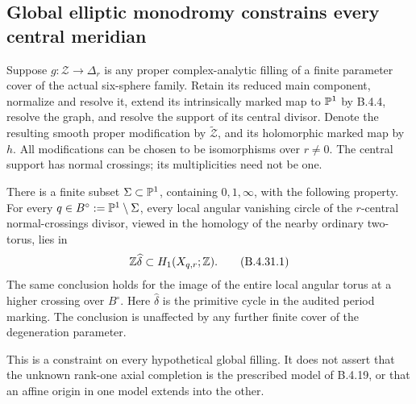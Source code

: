 \subsection{Global elliptic monodromy constrains every central meridian}

\begin{proposition}
Suppose $g:\mathcal Z\to\Delta_r$ is any proper complex-analytic
filling of a finite parameter cover of the actual six-sphere
family. Retain its reduced main component, normalize and resolve
it, extend its intrinsically marked map to $\mathbb P^1$ by B.4.4,
resolve the graph, and resolve the support of its central divisor. Denote
the resulting smooth proper modification by $\widetilde{\mathcal Z}$,
and its holomorphic marked map by $h$. All modifications can be
chosen to be isomorphisms over $r\ne0$. The central support has
normal crossings; its multiplicities need not be one.

There is a finite subset $\Sigma\subset\mathbb P^1$, containing
$0,1,\infty$, with the following property. For every
$q\in B^\circ:=\mathbb P^1\setminus\Sigma$, every local angular
vanishing circle of the $r$-central normal-crossings divisor,
viewed in the homology of the nearby ordinary two-torus, lies in
\[
             \mathbb Z\widehat\delta\subset H_1(X_{q,r};\mathbb Z).
 \tag{B.4.31.1}
\]
The same conclusion holds for the image of the entire local
angular torus at a higher crossing over $B^\circ$.
Here $\widehat\delta$ is the primitive cycle in the audited
period marking. The conclusion is unaffected by any further
finite cover of the degeneration parameter.

This is a constraint on every hypothetical global filling. It
does not assert that the unknown rank-one axial completion is
the prescribed model of B.4.19, or that an affine origin in one
model extends into the other.
\end{proposition}
